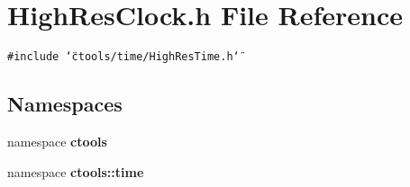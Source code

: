 \section{High\-Res\-Clock.h File Reference}
\label{HighResClock_8h}
{\tt \#include \char`\"{}ctools/time/High\-Res\-Time.h\char`\"{}}\par
\subsection*{Namespaces}
\begin{CompactItemize}
\item 
namespace {\bf ctools}
\item 
namespace {\bf ctools::time}
\end{CompactItemize}
